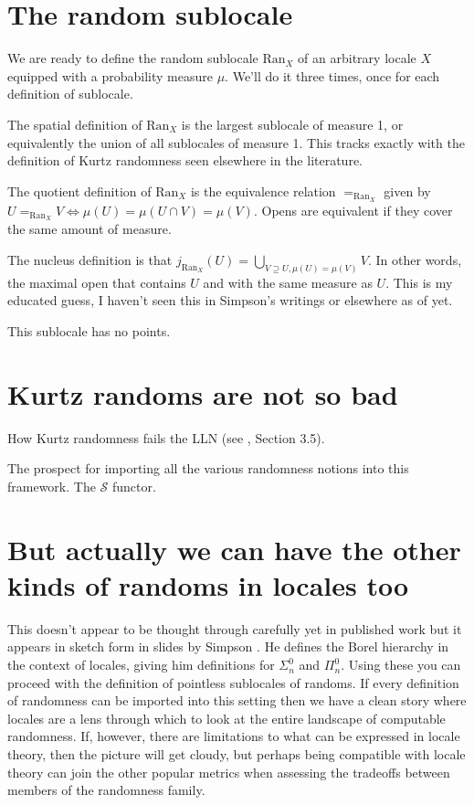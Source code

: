 \documentclass[14pt]{extarticle}
\newcommand{\ran}{\ensuremath{\mathrm{Ran}}}
\newcommand{\gc}[1]{\marginpar{\bf $\leftarrow$ {#1}}}
\begin{document}
\section{The random sublocale}
We are ready to define the random sublocale $\ran_X$ of an arbitrary locale $X$ equipped with a probability measure $\mu$. We'll do it three times, once for each definition of sublocale.

The spatial definition of $\ran_X$ is the largest sublocale of measure 1, or equivalently the union of all sublocales of measure 1. This tracks exactly with the definition of Kurtz randomness seen elsewhere in the literature.

The quotient definition of $\ran_X$ is the equivalence relation $=_{\ran_X}$ given by $U=_{\ran_X} V \iff \mu(U)=\mu(U\cap V)=\mu(V)$. Opens are equivalent if they cover the same amount of measure.

The nucleus definition is that $j_{\ran_X}(U) = \bigcup_{V\supseteq U, \mu(U)=\mu(V)}V.$ In other words, the maximal open that contains $U$ and with the same measure as $U$. This is my educated guess, I haven't seen this in Simpson's writings or elsewhere as of yet. \gc{So prove it, wimp.}

This sublocale has no points.

\section{Kurtz randoms are not so bad}
How Kurtz randomness fails the LLN (see \cite{NiesAndre2009CaR}, Section 3.5). 

The prospect for importing all the various randomness notions into this framework. The $\mathcal{S}$ functor.

\section{But actually we can have the other kinds of randoms in locales too}
This doesn't appear to be thought through carefully yet in published work but it appears in sketch form in slides by Simpson \cite{simpson2}. He defines the Borel hierarchy in the context of locales, giving him definitions for $\Sigma^0_n$ and $\Pi^0_n$. Using these you can proceed with the definition of pointless sublocales of randoms. If every definition of randomness can be imported into this setting then we have a clean story where locales are a lens through which to look at the entire landscape of computable randomness. If, however, there are limitations to what can be expressed in locale theory, then the picture will get cloudy, but perhaps being compatible with locale theory can join the other popular metrics when assessing the tradeoffs between members of the randomness family.
\end{document}
